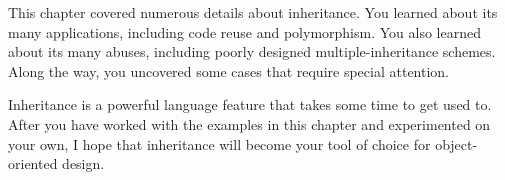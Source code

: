 This chapter covered numerous details about inheritance. You learned about its many applications, including code reuse and polymorphism. You also learned about its many abuses, including poorly designed multiple-inheritance schemes. Along the way, you uncovered some cases that require special attention.

Inheritance is a powerful language feature that takes some time to get used to. After you have worked with the examples in this chapter and experimented on your own, I hope that inheritance will become your tool of choice for object-oriented design.
